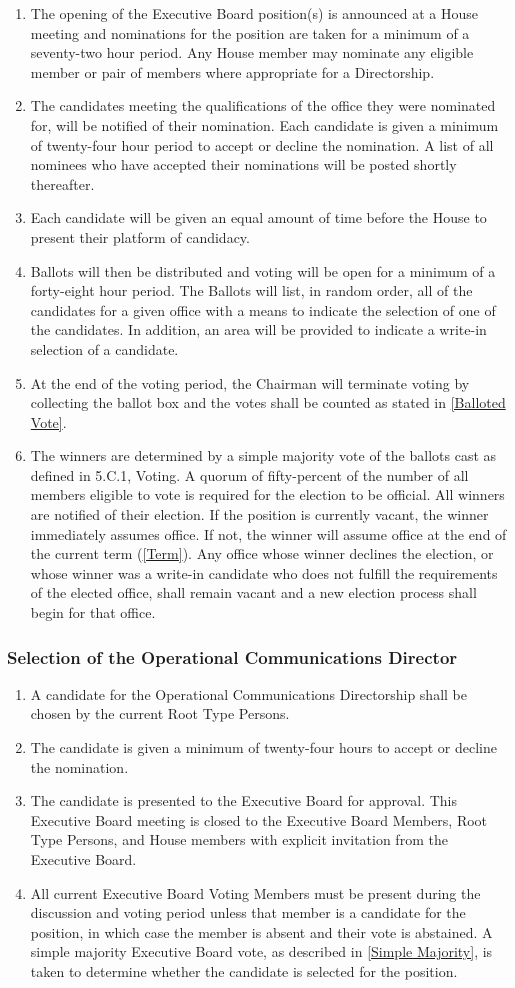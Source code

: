 \documentclass{article}
\newcommand{\asubsection}[1]{\subsubsection{#1} \label{#1}}
\begin{document}
\begin{enumerate}
	\item The opening of the Executive Board position(s) is announced at a House meeting and nominations for the position are taken for a minimum of a seventy-two hour period. Any House member may nominate any eligible member or pair of members where appropriate for a Directorship.
	\item The candidates meeting the qualifications of the office they were nominated for, will be notified of their nomination. Each candidate is given a minimum of twenty-four hour period to accept or decline the nomination. A list of all nominees who have accepted their nominations will be posted shortly thereafter.
	\item Each candidate will be given an equal amount of time before the House to present their platform of candidacy.
	\item Ballots will then be distributed and voting will be open for a minimum of a forty-eight hour period. The Ballots will list, in random order, all of the candidates for a given office with a means to indicate the selection of one of the candidates. In addition, an area will be provided to indicate a write-in selection of a candidate.
	\item At the end of the voting period, the Chairman will terminate voting by collecting the ballot box and the votes shall be counted as stated in \ref{Balloted Vote}.
	\item The winners are determined by a simple majority vote of the ballots cast as defined in 5.C.1, Voting. A quorum of fifty-percent of the number of all members eligible to vote is required for the election to be official. All winners are notified of their election. If the position is currently vacant, the winner immediately assumes office. If not, the winner will assume office at the end of the current term (\ref{Term}). Any office whose winner declines the election, or whose winner was a write-in candidate who does not fulfill the requirements of the elected office, shall remain vacant and a new election process shall begin for that office.
\end{enumerate}
\asubsection{Selection of the Operational Communications Director}
\begin{enumerate}
	\item A candidate for the Operational Communications Directorship shall be chosen by the current Root Type Persons.
	\item The candidate is given a minimum of twenty-four hours to accept or decline the nomination.
	\item The candidate is presented to the Executive Board for approval. This Executive Board meeting is closed to the Executive Board Members, Root Type Persons, and House members with explicit invitation from the Executive Board.
	\item All current Executive Board Voting Members must be present during the discussion and voting period unless that member is a candidate for the position, in which case the member is absent and their vote is abstained. A simple majority Executive Board vote, as described in \ref{Simple Majority}, is taken to determine whether the candidate is selected for the position.
\end{enumerate}
\end{document}
